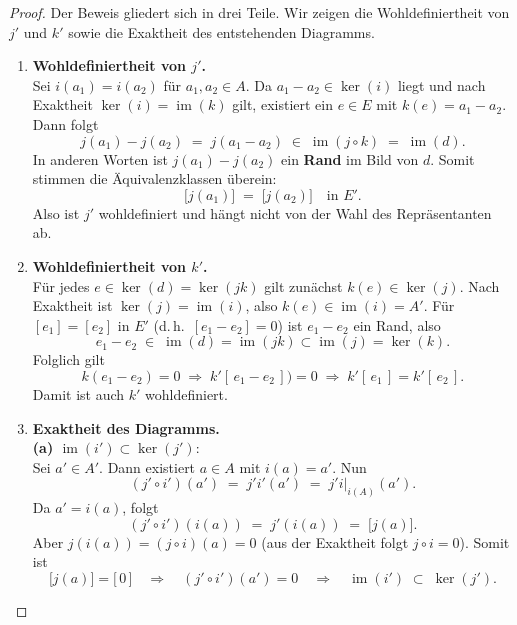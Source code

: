 \documentclass[12pt]{article}
\numberwithin{conj}{section}
\newcommand{\ima}{\operatorname{im}}
\begin{document}
    \begin{proof}
        Der Beweis gliedert sich in drei Teile. Wir zeigen die Wohldefiniertheit von
        $j'$ und $k'$ sowie die Exaktheit des entstehenden Diagramms.

        \begin{enumerate}[nolistsep]
            \item \textbf{Wohldefiniertheit von $j'$.} \\ Sei $i(a_{1}) = i(a_{2})$
                für $a_{1}, a_{2} \in A$. Da $a_{1} - a_{2} \in \ker(i)$ liegt und nach Exaktheit
                $\ker(i) = \ima(k)$ gilt, existiert ein $e \in E$ mit
                $k(e) = a_{1} - a_{2}$. Dann folgt
                \[
                    j(a_{1}) - j(a_{2}) \;=\; j(a_{1} - a_{2}) \;\in\; \ima(j \circ k) \;=\; \ima
                    (d).
                \]
                In anderen Worten ist $j(a_{1}) - j(a_{2})$ ein \textbf{Rand} im Bild
                von $d$. Somit stimmen die Äquivalenzklassen überein:
                \[
                    \bigl[j(a_{1})\bigr] \;=\; \bigl[j(a_{2})\bigr] \quad\text{in }E'.
                \]
                Also ist $j'$ wohldefiniert und hängt nicht von der Wahl des
                Repräsentanten ab.

            \item \textbf{Wohldefiniertheit von $k'$.} \\ Für jedes
                $e \in \ker(d) = \ker(jk)$ gilt zunächst $k(e) \in \ker(j)$. Nach Exaktheit
                ist $\ker(j) = \ima(i)$, also $k(e) \in \ima(i) = A'$. Für $[e_{1}] = [e_{2}
                ]$ in $E'$ (d.\,h.\ $[e_{1} - e_{2}] = 0$) ist $e_{1} - e_{2}$ ein Rand,
                also
                \[
                    e_{1} - e_{2} \;\in\; \ima(d) = \ima(jk) \subset \ima(j) = \ker(k).
                \]
                Folglich gilt
                \[
                    k(e_{1} - e_{2}) = 0 \;\Longrightarrow\; k' [\,e_{1} - e_{2}\,]\bigr
                    ) = 0 \;\Longrightarrow\; k' [\,e_{1}\,]  = k' [\,e_{2}\,
                    ] .
                \]
                Damit ist auch $k'$ wohldefiniert.

            \item \textbf{Exaktheit des Diagramms.} \\ \textbf{(a)
                $\ima(i') \subset \ker(j')$}:\\ Sei $a' \in A'$. Dann existiert
                $a \in A$ mit $i(a) = a'$. Nun
                \[
                    (j' \circ i')(a') \;=\; j' i'(a')  \;=\; j' i\vert_{i(A)}
                    (a') .
                \]
                Da $a' = i(a)$, folgt
                \[
                    (j' \circ i')(i(a)) \;=\; j'(i(a)) \;=\; \bigl[j(a)\bigr].
                \]
                Aber $j(i(a)) = (j \circ i)(a) = 0$ (aus der Exaktheit folgt $j \circ i =
                0$). Somit ist
                \[
                    \bigl[j(a)\bigr] = \bigl[\,0\,\bigr] \quad\Longrightarrow\quad (j' \circ
                    i')(a') = 0 \quad\Longrightarrow\quad \ima(i') \;\subset\; \ker(j').
                \]


\end{enumerate}
\end{proof}
\end{document}
